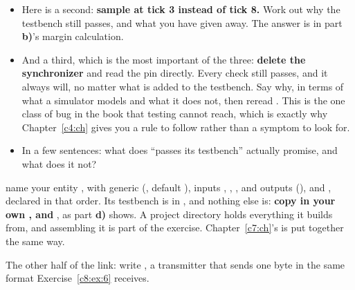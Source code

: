\begin{parts}
\begin{itemize}
        testbench does \textbf{not} catch. Here is one: \textbf{delete the mid-start-bit re-check},
        so  moves to  at tick 8 without confirming the line is
        still low. The testbench never puts a glitch on an idle line, so nothing notices, and on
        real hardware a single noise spike starts a phantom frame. Read  and
        say what you would add to catch it.
      \item Here is a second: \textbf{sample at tick 3 instead of tick 8.} Work out why the
        testbench still passes, and what you have given away. The answer is in part \textbf{b)}'s
        margin calculation.
      \item And a third, which is the most important of the three: \textbf{delete the 
        synchronizer} and read the pin directly. Every check still passes, and it always will, no
        matter what is added to the testbench. Say why, in terms of what a simulator models and
        what it does not, then reread . This is the one class of bug in the book
        that testing cannot reach, which is exactly why Chapter~\ref{c4:ch} gives you a rule to
        follow rather than a symptom to look for.
      \item In a few sentences: what does ``passes its testbench'' actually promise, and what does
        it not?
    \end{itemize}
\end{parts}


\selfcheck name your entity , with generic 
(, default ), inputs , , , and outputs
 (),  and ,
declared in that order. Its testbench is in , and nothing else is:
\textbf{copy in your own ,  and }, as part \textbf{d)}
shows. A project directory holds everything it builds from, and assembling it is part of the
exercise. Chapter~\ref{c7:ch}'s  is put together the same way.

\label{c8:ex:7}
The other half of the link: write , a transmitter that sends one byte in the same
format Exercise~\ref{c8:ex:6} receives.

